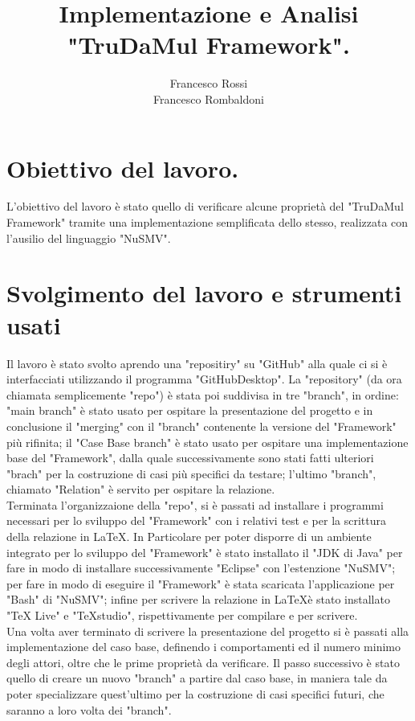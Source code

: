 \documentclass[13pt,a4paper]{article}
\title{ Implementazione  e Analisi "TruDaMul Framework".}
\author{Francesco Rossi \\
				Francesco Rombaldoni}
\date{}
\begin{document}
	\maketitle
	\newpage
	
	\newpage
	
	\section{Obiettivo del  lavoro.}
	L'obiettivo del lavoro è stato quello di verificare alcune proprietà del "TruDaMul Framework" tramite una implementazione semplificata dello stesso, realizzata con l'ausilio del linguaggio "NuSMV".\\
	
	\section{Svolgimento del lavoro e strumenti usati}
	Il lavoro è stato svolto aprendo una "repositiry" su "GitHub" alla quale ci si è interfacciati utilizzando il programma "GitHubDesktop". La "repository" (da ora chiamata semplicemente "repo") è stata poi suddivisa in tre "branch", in ordine: "main branch" è stato usato per ospitare la presentazione del progetto e in conclusione il "merging" con il "branch" contenente la versione del "Framework" più rifinita; il "Case Base branch" è stato usato per ospitare una implementazione base del "Framework", dalla quale successivamente sono stati fatti ulteriori "brach" per la costruzione di casi più specifici da testare; l'ultimo "branch", chiamato "Relation" è servito per ospitare la relazione. \\
	Terminata l'organizzaione della "repo", si è passati ad installare i programmi necessari per lo sviluppo del "Framework" con i relativi test e per la scrittura della relazione in \LaTeX. In Particolare per poter disporre di un ambiente integrato per lo sviluppo del "Framework" è stato installato il "JDK di Java" per fare in modo di installare successivamente "Eclipse" con l'estenzione "NuSMV"; per fare in modo di eseguire il "Framework" è stata scaricata l'applicazione per "Bash" di "NuSMV"; infine per scrivere la relazione in \LaTeX è stato installato "TeX Live" e "TeXstudio", rispettivamente per compilare e per scrivere.\\
	Una volta aver terminato di scrivere la presentazione del progetto si è passati alla implementazione  del caso base, definendo i comportamenti ed il numero minimo degli attori, oltre che le prime proprietà da verificare. Il passo successivo è stato quello di creare un nuovo "branch" a partire dal caso base, in maniera tale da poter specializzare quest'ultimo per la costruzione di  casi specifici futuri, che saranno a loro volta dei "branch".\\
	 
\end{document}
